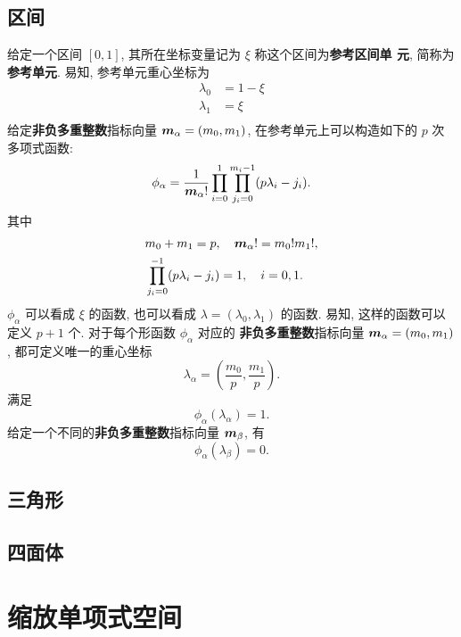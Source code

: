 \subsection{区间}
给定一个区间 $[0,1]$, 其所在坐标变量记为 $\xi$ 称这个区间为{\bf 参考区间单
	元}, 简称为{\bf 参考单元}.  易知, 参考单元重心坐标为
\begin{align*}
	\lambda_0 &= 1 - \xi\\
	\lambda_1 &= \xi\\
\end{align*}
给定{\bf 非负多重整数}指标向量 ${\boldsymbol m}_\alpha = (m_0, m_1)$, 在参考单元上可以构造如下的 $p$ 次多项式函数:
\begin{equation}
	\phi_{\alpha} = \frac{1}{{\boldsymbol m}_\alpha!}\prod_{i=0}^{1}\prod_{j_i =
		0}^{m_i - 1} (p\lambda_i - j_i).
	\label{eq:phi}
\end{equation}
其中
\begin{align*}
	&m_0 + m_1 = p,\quad {\boldsymbol m}_\alpha! = m_0!m_1!, \\
	&\prod_{j_i=0}^{-1}(p\lambda_i - j_i) = 1,\quad i = 0, 1.
\end{align*}
$\phi_{\alpha}$ 可以看成 $\xi$ 的函数, 也可以看成 $\lambda
= (\lambda_0, \lambda_1)$ 的函数. 易知, 这样的函数可以定义
$p+1$ 个.
对于每个形函数 $\phi_\alpha$ 对应的 {\bf 非负多重整数}指标向量 ${\boldsymbol m}_\alpha
= (m_0, m_1)$, 都可定义唯一的重心坐标
$$
\lambda_\alpha = (\frac{m_0}{p}, \frac{m_1}{p}).
$$
满足
\begin{equation*}
	\phi_\alpha(\lambda_\alpha) = 1.
\end{equation*}
给定一个不同的{\bf 非负多重整数}指标向量 ${\boldsymbol m}_\beta$, 有
\begin{equation*}
	\phi_\alpha(\lambda_\beta) = 0.
\end{equation*}
\subsection{三角形}
\subsection{四面体}
\section{缩放单项式空间}
